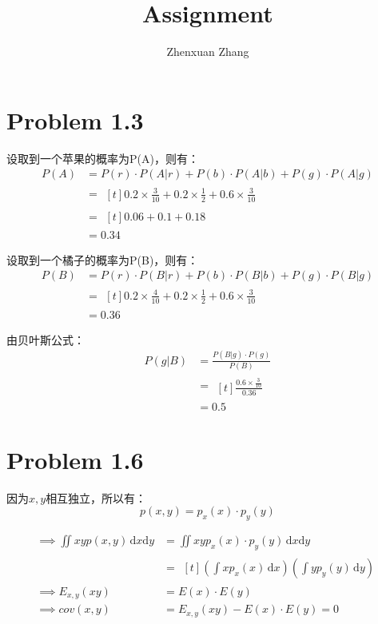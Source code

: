 \documentclass[11.5pt]{article}
\title{Assignment \uppercase\expandafter{\romannumeral2}}
\author{Zhenxuan Zhang}
\begin{document}
\maketitle
\section{Problem 1.3}
	设取到一个苹果的概率为P(A)，则有：
\begin{align*}
P(A) &= P(r)\cdot P(A|r) + P(b)\cdot P(A|b) +P(g)\cdot P(A|g)  \\
&= \begin{multlined}[t]
0.2\times \frac{3}{10} + 0.2\times \frac12 +0.6\times \frac{3}{10}
\end{multlined}\\
&= \begin{multlined}[t]
0.06+0.1+0.18
\end{multlined}\\
&= 0.34
\end{align*}

	设取到一个橘子的概率为P(B)，则有：
\begin{align*}
P(B) &= P(r)\cdot P(B|r) + P(b)\cdot P(B|b) +P(g)\cdot P(B|g)  \\
&= \begin{multlined}[t]
0.2\times \frac{4}{10} + 0.2\times \frac12 +0.6\times \frac{3}{10}
\end{multlined}\\
&= 0.36
\end{align*}

由贝叶斯公式：
\begin{align*}
P(g|B) &= \frac{P(B|g)\cdot P(g)}{P(B)}  \\
&= \begin{multlined}[t]
\frac{0.6\times \frac{3}{10}}{0.36} 
\end{multlined}\\
&= 0.5
\end{align*}

\section{Problem 1.6}
 因为$x,y$相互独立，所以有：
 \[
 p(x,y) = p_x(x)\cdot p_y(y)
 \]

\begin{align*}
\implies
\iint xyp(x,y) \,\mathrm{d}x \mathrm{d}y &= 
\iint xyp_x(x)\cdot p_y(y) \,\mathrm{d}x \mathrm{d}y \\
&= \begin{multlined}[t]
\left( \int xp_x(x) \,\mathrm{d}x \right) \left(\int yp_y(y) \,\mathrm{d}y \right)
\end{multlined}\\
\implies
E_{x,y}(xy) &= E(x)\cdot E(y) \\
\implies
cov(x,y) &= E_{x,y}(xy) - E(x)\cdot E(y) = 0
\end{align*}
\end{document}
